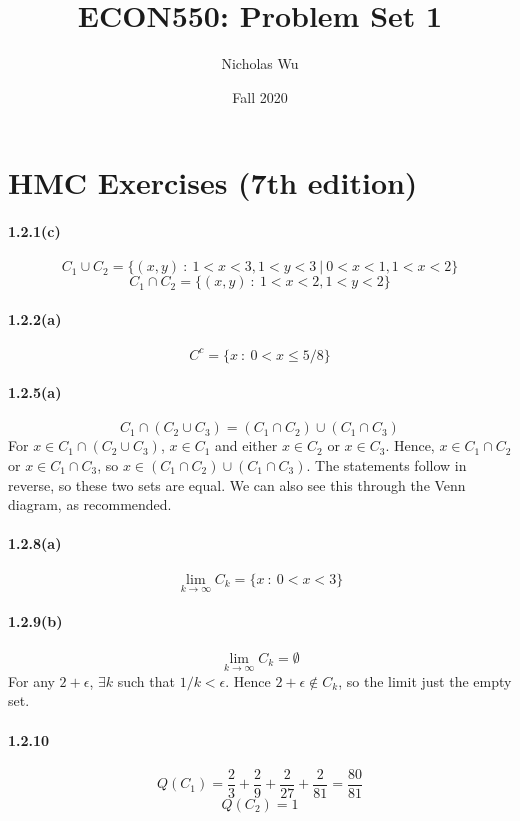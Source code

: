 \documentclass[10pt,letter]{article}
\begin{document}


\title{ECON550: Problem Set 1}

\author{Nicholas Wu}

\date{Fall 2020}

\maketitle
\section*{HMC Exercises (7th edition)}
\paragraph{1.2.1(c)}
\[ C_1 \cup C_2 = \{ (x,y) \ : \ 1 < x < 3,  1 < y < 3 \ | \ 0 < x < 1, 1 < x < 2 \}  \]
\[ C_1 \cap C_2 = \{ (x,y) \ : \ 1 < x < 2,  1 < y < 2 \}  \]
\paragraph{1.2.2(a)}
\[ C^c = \{ x \ : \  0 < x \le 5/8 \} \]
\paragraph{1.2.5(a)}
\[ C_1 \cap (C_2 \cup C_3) = (C_1 \cap C_2) \cup (C_1 \cap C_3) \]
For $x \in C_1 \cap (C_2 \cup C_3)$, $x \in C_1$ and either $x \in C_2$ or $x\in C_3$. Hence, $x \in C_1 \cap C_2$ or $x \in C_1 \cap C_3$, so $x \in (C_1 \cap C_2) \cup (C_1 \cap C_3)$. The statements follow in reverse, so these two sets are equal. We can also see this through the Venn diagram, as recommended.
\paragraph{1.2.8(a)}
\[ \lim_{k \to \infty} C_k = \{ x \ : \ 0 < x < 3 \} \]
\paragraph{1.2.9(b)}
\[ \lim_{k \to \infty} C_k = \emptyset \]
For any $2 + \epsilon$, $\exists k $ such that $1/k < \epsilon$. Hence $2+\epsilon \not \in C_k$, so the limit just the empty set.
\paragraph{1.2.10}
\[ Q(C_1) = \frac{2}{3} + \frac{2}{9} + \frac{2}{27} + \frac{2}{81} = \frac{80}{81} \]
\[ Q(C_2) = 1 \]
\end{document}
